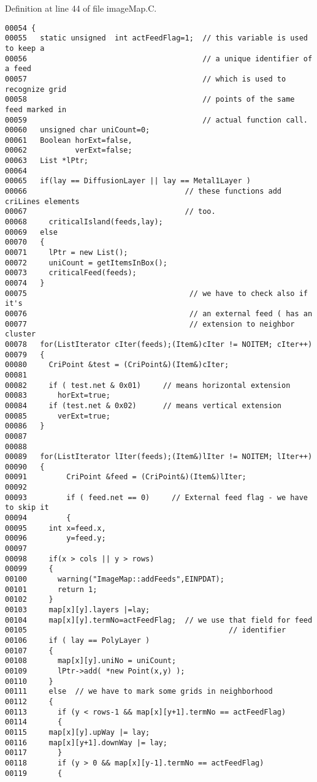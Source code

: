 Definition at line 44 of file image\-Map.C.\small\begin{verbatim}00054 {
00055   static unsigned  int actFeedFlag=1;  // this variable is used to keep a
00056                                        // a unique identifier of a feed
00057                                        // which is used to recognize grid
00058                                        // points of the same feed marked in
00059                                        // actual function call.
00060   unsigned char uniCount=0;
00061   Boolean horExt=false,
00062           verExt=false;
00063   List *lPtr;
00064   
00065   if(lay == DiffusionLayer || lay == Metal1Layer ) 
00066                                    // these functions add criLines elements
00067                                    // too.
00068     criticalIsland(feeds,lay);
00069   else
00070   {
00071     lPtr = new List();
00072     uniCount = getItemsInBox();
00073     criticalFeed(feeds);
00074   }
00075                                     // we have to check also if it's
00076                                     // an external feed ( has an
00077                                     // extension to neighbor cluster
00078   for(ListIterator cIter(feeds);(Item&)cIter != NOITEM; cIter++)  
00079   {
00080     CriPoint &test = (CriPoint&)(Item&)cIter;
00081 
00082     if ( test.net & 0x01)     // means horizontal extension
00083       horExt=true;
00084     if (test.net & 0x02)      // means vertical extension
00085       verExt=true;
00086   }
00087   
00088 
00089   for(ListIterator lIter(feeds);(Item&)lIter != NOITEM; lIter++)
00090   {
00091         CriPoint &feed = (CriPoint&)(Item&)lIter;
00092 
00093         if ( feed.net == 0)     // External feed flag - we have to skip it
00094         {
00095     int x=feed.x,
00096         y=feed.y;
00097     
00098     if(x > cols || y > rows)
00099     {
00100       warning("ImageMap::addFeeds",EINPDAT);
00101       return 1;
00102     }
00103     map[x][y].layers |=lay;
00104     map[x][y].termNo=actFeedFlag;  // we use that field for feed
00105                                              // identifier
00106     if ( lay == PolyLayer )
00107     {
00108       map[x][y].uniNo = uniCount;
00109       lPtr->add( *new Point(x,y) );
00110     }
00111     else  // we have to mark some grids in neighborhood
00112     {
00113       if (y < rows-1 && map[x][y+1].termNo == actFeedFlag)
00114       {
00115     map[x][y].upWay |= lay;
00116     map[x][y+1].downWay |= lay;
00117       }
00118       if (y > 0 && map[x][y-1].termNo == actFeedFlag)
00119       {

\end{verbatim}
